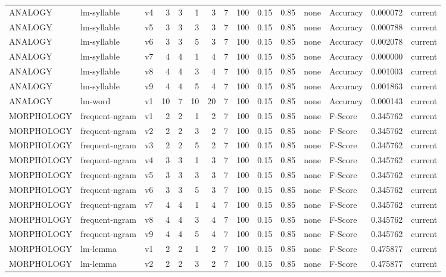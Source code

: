 \documentclass{article}
\begin{document}
\begin{xltabular}{\linewidth}{@{}lYcrrrrrrrrYlrl@{}}
ANALOGY & lm-syllable & v4 & 3 & 3 & 1 & 3 & 7 & 100 & 0.15 & 0.85 & none & Accuracy & 0.000072 & current \\
ANALOGY & lm-syllable & v5 & 3 & 3 & 3 & 3 & 7 & 100 & 0.15 & 0.85 & none & Accuracy & 0.000788 & current \\
ANALOGY & lm-syllable & v6 & 3 & 3 & 5 & 3 & 7 & 100 & 0.15 & 0.85 & none & Accuracy & 0.002078 & current \\
ANALOGY & lm-syllable & v7 & 4 & 4 & 1 & 4 & 7 & 100 & 0.15 & 0.85 & none & Accuracy & 0.000000 & current \\
ANALOGY & lm-syllable & v8 & 4 & 4 & 3 & 4 & 7 & 100 & 0.15 & 0.85 & none & Accuracy & 0.001003 & current \\
ANALOGY & lm-syllable & v9 & 4 & 4 & 5 & 4 & 7 & 100 & 0.15 & 0.85 & none & Accuracy & 0.001863 & current \\
ANALOGY & lm-word & v1 & 10 & 7 & 10 & 20 & 7 & 100 & 0.15 & 0.85 & none & Accuracy & 0.000143 & current \\
MORPHOLOGY & frequent-ngram & v1 & 2 & 2 & 1 & 2 & 7 & 100 & 0.15 & 0.85 & none & F-Score & 0.345762 & current \\
MORPHOLOGY & frequent-ngram & v2 & 2 & 2 & 3 & 2 & 7 & 100 & 0.15 & 0.85 & none & F-Score & 0.345762 & current \\
MORPHOLOGY & frequent-ngram & v3 & 2 & 2 & 5 & 2 & 7 & 100 & 0.15 & 0.85 & none & F-Score & 0.345762 & current \\
MORPHOLOGY & frequent-ngram & v4 & 3 & 3 & 1 & 3 & 7 & 100 & 0.15 & 0.85 & none & F-Score & 0.345762 & current \\
MORPHOLOGY & frequent-ngram & v5 & 3 & 3 & 3 & 3 & 7 & 100 & 0.15 & 0.85 & none & F-Score & 0.345762 & current \\
MORPHOLOGY & frequent-ngram & v6 & 3 & 3 & 5 & 3 & 7 & 100 & 0.15 & 0.85 & none & F-Score & 0.345762 & current \\
MORPHOLOGY & frequent-ngram & v7 & 4 & 4 & 1 & 4 & 7 & 100 & 0.15 & 0.85 & none & F-Score & 0.345762 & current \\
MORPHOLOGY & frequent-ngram & v8 & 4 & 4 & 3 & 4 & 7 & 100 & 0.15 & 0.85 & none & F-Score & 0.345762 & current \\
MORPHOLOGY & frequent-ngram & v9 & 4 & 4 & 5 & 4 & 7 & 100 & 0.15 & 0.85 & none & F-Score & 0.345762 & current \\
MORPHOLOGY & lm-lemma & v1 & 2 & 2 & 1 & 2 & 7 & 100 & 0.15 & 0.85 & none & F-Score & 0.475877 & current \\
MORPHOLOGY & lm-lemma & v2 & 2 & 2 & 3 & 2 & 7 & 100 & 0.15 & 0.85 & none & F-Score & 0.475877 & current \\

\end{xltabular}
\end{document}
